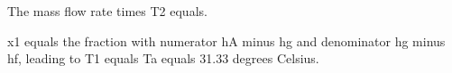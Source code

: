 The mass flow rate times T2 equals.

x1 equals the fraction with numerator hA minus hg and denominator hg minus hf, leading to T1 equals Ta equals 31.33 degrees Celsius.